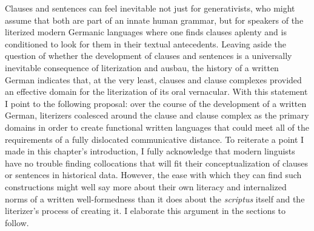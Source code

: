Clauses and sentences can feel inevitable not just for generativists, who might assume that both are part of an innate human grammar, but for speakers of the literized modern Germanic languages where one finds clauses aplenty and is conditioned to look for them in their textual antecedents. Leaving aside the question of whether the development of clauses and sentences is a universally inevitable consequence of literization and ausbau, the history of a written German indicates that, at the very least, clauses and clause complexes provided an effective domain for the literization of its oral vernacular. With this statement I point to the following proposal: over the course of the development of a written German, literizers coalesced around the clause and clause complex as the primary domains in order to create functional written languages that could meet all of the requirements of a fully dislocated communicative distance. To reiterate a point I made in this chapter’s introduction, I fully acknowledge that modern linguists have no trouble finding collocations that will fit their conceptualization of clauses or sentences in historical data. However, the ease with which they can find such constructions might well say more about their own literacy and internalized norms of a written well-formedness than it does about the \textit{scriptus} itself and the literizer’s process of creating it. I elaborate this argument in the sections to follow.

